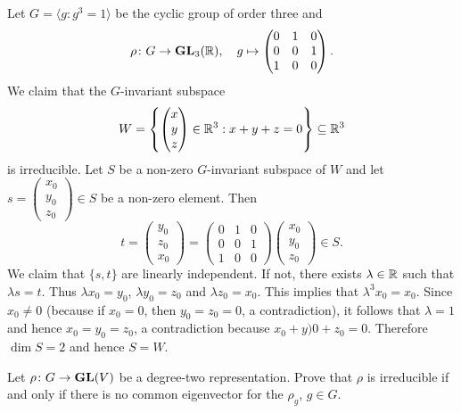 \begin{example}
        Let $G=\langle g:g^3=1\rangle$ be the 
    cyclic group of order three  
    and 
    \[
    \rho\colon G\to\mathbf{GL}_3(\mathbb{R}),
    \quad
    g\mapsto\begin{pmatrix}
        0&1&0\\
        0&0&1\\
        1&0&0
    \end{pmatrix}.
    \]
    We claim that the $G$-invariant subspace
    \[
    W=\left\{
    \begin{pmatrix}
    x\\
    y\\
    z
    \end{pmatrix}\in\mathbb{R}^3:x+y+z=0\right\}\subseteq\mathbb{R}^3
    \]
    is irreducible. Let $S$ be a non-zero $G$-invariant subspace of $W$ and let $s=\begin{pmatrix}x_0\\y_0\\z_0\end{pmatrix}\in S$ be a non-zero element. Then
    \[
    t=\begin{pmatrix}y_0\\z_0\\x_0\end{pmatrix}
    =\begin{pmatrix}
        0&1&0\\
        0&0&1\\
        1&0&0
    \end{pmatrix}
    \begin{pmatrix}x_0\\y_0\\z_0\end{pmatrix}\in S.
    \]
    We claim that $\{s,t\}$ are linearly independent. If not, there exists $\lambda\in\mathbb{R}$ such that
    $\lambda s=t$. Thus $\lambda x_0=y_0$, $\lambda y_0=z_0$ and $\lambda z_0=x_0$. This implies that
    $\lambda^3x_0=x_0$. Since $x_0\ne 0$ (because if $x_0=0$, then $y_0=z_0=0$, a contradiction), it follows that
    $\lambda=1$ and hence $x_0=y_0=z_0$, a contradiction because $x_0+y)0+z_0=0$. 
    Therefore $\dim S=2$ and hence $S=W$. 
\end{example}

\begin{exercise}
    Let $\rho\colon G\to\mathbf{GL}(V)$ be a degree-two representation. Prove that
    $\rho$ is irreducible if and only if there is no common eigenvector for the $\rho_g$, $g\in G$. 
\end{exercise}

